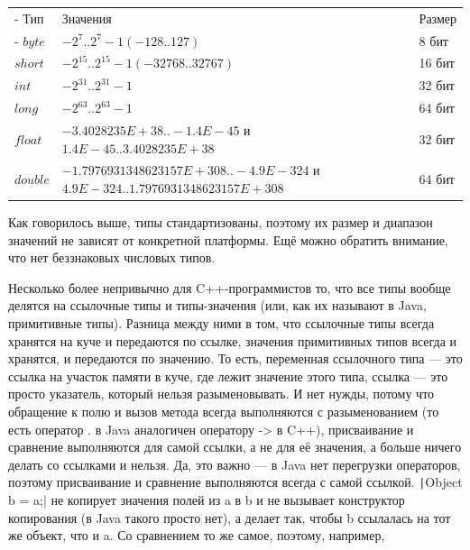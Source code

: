\documentclass[a5paper]{article}
\begin{document}
\begin{tabu} {| X[0.3 l p] | X[1 l p] | X[0.2 l p] |}
	\tabucline-
	Тип       & Значения                                                                              & Размер  \\
	\tabucline-
	\everyrow{\tabucline-}
	$byte$    & $-2^7..2^7-1 (-128..127)$                                                             & 8 бит   \\
	$short$   & $-2^{15}..2^{15}-1 (-32768..32767)$                                                       & 16 бит  \\
	$int$     & $-2^{31}..2^{31}-1$                                                                       & 32 бит  \\
	$long$    & $-2^{63} .. 2^{63}-1$                                                                     & 64 бит  \\
	$float$   & $-3.4028235E+38..-1.4E-45$ \newline и $1.4E-45..3.4028235E+38$                        & 32 бит  \\
	$double$  & $-1.7976931348623157E+308..-4.9E-324$ \newline и $4.9E-324..1.7976931348623157E+308$  & 64 бит  \\
\end{tabu}

Как говорилось выше, типы стандартизованы, поэтому их размер и диапазон значений не зависят от конкретной платформы. Ещё можно обратить внимание, что нет беззнаковых числовых типов.

Несколько более непривычно для C++-программистов то, что все типы вообще делятся на ссылочные типы и типы-значения (или, как их называют в Java, примитивные типы). Разница между ними в том, что ссылочные типы всегда хранятся на куче и передаются по ссылке, значения примитивных типов всегда и хранятся, и передаются по значению. То есть, переменная ссылочного типа --- это ссылка на участок памяти в куче, где лежит значение этого типа, ссылка --- это просто указатель, который нельзя разыменовывать. И нет нужды, потому что обращение к полю и вызов метода всегда выполняются с разыменованием (то есть оператор . в Java аналогичен оператору -> в C++), присваивание и сравнение выполняются для самой ссылки, а не для её значения, а больше ничего делать со ссылками и нельзя. Да, это важно --- в Java нет перегрузки операторов, поэтому присваивание и сравнение выполняются всегда с самой ссылкой. \texttt|Object b = a;| не  копирует значения полей из a в b и не вызывает конструктор копирования (в Java такого просто нет), а делает так, чтобы b ссылалась на тот же объект, что и a. Со сравнением то же самое, поэтому, например, 
\end{document}
